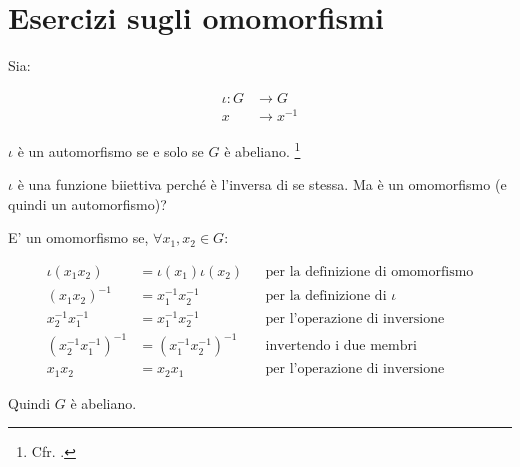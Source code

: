 \chapter{Esercizi sugli omomorfismi}

\begin{esercizio}
	\label{ex:automorfismo_iota}
	Sia:
	
	\begin{align}
		\iota : G &\longrightarrow G \\
		x &\longrightarrow x^{-1}
	\end{align}

	$\iota$ è un automorfismo se e solo se $G$ è abeliano.
	\footnote{Cfr. \cite[pag. 63, es. n. 3]{jacobson}.}
\end{esercizio}
\begin{soluzione}
	$\iota$ è una funzione biiettiva perché è l'inversa di se stessa. Ma è un omomorfismo (e quindi un automorfismo)?
	
	E' un omomorfismo se, $\forall x_1, x_2 \in G$:
	
	\begin{align}
		\iota(x_1x_2) &= \iota(x_1)\iota(x_2) &&\text{per la definizione di omomorfismo} \\
		(x_1x_2)^{-1} &= x_1^{-1}x_2^{-1} &&\text{per la definizione di $\iota$} \\
		x_2^{-1}x_1^{-1} &= x_1^{-1}x_2^{-1} &&\text{per l'operazione di inversione} \\
		(x_2^{-1}x_1^{-1})^{-1} &= (x_1^{-1}x_2^{-1})^{-1} &&\text{invertendo i due membri} \\
		x_1x_2 &= x_2x_1 &&\text{per l'operazione di inversione}
	\end{align}

	Quindi $G$ è abeliano.
\end{soluzione}

